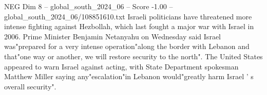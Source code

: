 \begin{textsample}{NEG Dim 8 – global\_south\_2024\_06 – Score -1.00 – global\_south\_2024\_06/108851610.txt}
Israeli politicians have threatened more intense fighting against Hezbollah, which last fought a major war with Israel in 2006.
Prime Minister Benjamin Netanyahu on Wednesday said Israel was"prepared for a very intense operation"along the border with Lebanon and that"one way or another, we will restore security to the north".
The United States appeared to warn Israel against acting, with State Department spokesman Matthew Miller saying any"escalation"in Lebanon would"greatly harm Israel ' s overall security".

\end{textsample}
